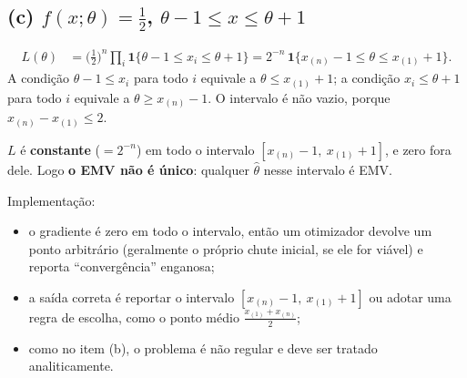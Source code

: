 \documentclass[11pt,a4paper]{article}
\newcommand{\ind}{\mathbf{1}}
\theoremstyle{definition}
\theoremstyle{plain}
\begin{document}
\subsection*{(c) $f(x;\theta)=\frac12$, $\theta-1\le x\le\theta+1$}
\begin{align*}
L(\theta)&=\Big(\frac12\Big)^n\prod_i\ind\{\theta-1\le x_i\le\theta+1\}
=2^{-n}\,\ind\{x_{(n)}-1\le\theta\le x_{(1)}+1\}.
\end{align*}
A condição $\theta-1\le x_i$ para todo $i$ equivale a $\theta\le x_{(1)}+1$; a condição $x_i\le\theta+1$ para todo $i$ equivale a $\theta\ge x_{(n)}-1$. O intervalo é não vazio, porque $x_{(n)}-x_{(1)}\le2$.
\begin{resposta}
$L$ é \textbf{constante} ($=2^{-n}$) em todo o intervalo $[x_{(n)}-1,\ x_{(1)}+1]$, e zero fora dele. Logo \textbf{o EMV não é único}: qualquer $\hat\theta$ nesse intervalo é EMV.

Implementação:
\begin{itemize}[leftmargin=1.2em]
\item o gradiente é zero em todo o intervalo, então um otimizador devolve um ponto arbitrário (geralmente o próprio chute inicial, se ele for viável) e reporta ``convergência'' enganosa;
\item a saída correta é reportar o intervalo $[x_{(n)}-1,\ x_{(1)}+1]$ ou adotar uma regra de escolha, como o ponto médio $\frac{x_{(1)}+x_{(n)}}{2}$;
\item como no item (b), o problema é não regular e deve ser tratado analiticamente.
\end{itemize}
\end{resposta}
\end{document}
